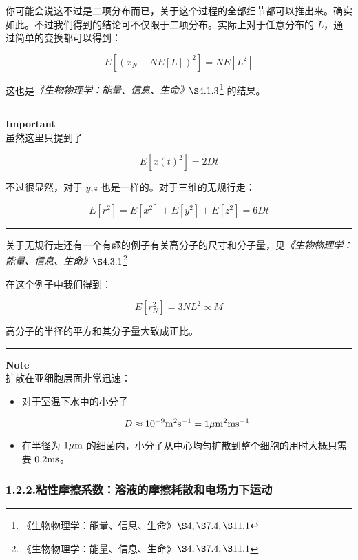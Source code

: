 \documentclass[
]{article}
\begin{document}
你可能会说这不过是二项分布而已，关于这个过程的全部细节都可以推出来。确实如此。不过我们得到的结论可不仅限于二项分布。实际上对于任意分布的
\(L\)，通过简单的变换都可以得到：

\[E[(x_N-NE[L])^2]=NE[L^2]\]

这也是\emph{《生物物理学：能量、信息、生命》\(\S4.1.3\)}\footnote{《生物物理学：能量、信息、生命》\(\S4,\S7.4,\S11.1\)}
的结果。

\begin{center}\rule{0.5\linewidth}{0.5pt}\end{center}

\textbf{Important}\\

虽然这里只提到了

\[E[x(t)^2]=2Dt\]

不过很显然，对于 \(y\),\(z\) 也是一样的。对于三维的无规行走：

\[E[r^2]=E[x^2]+E[y^2]+E[z^2]=6Dt\]

\begin{center}\rule{0.5\linewidth}{0.5pt}\end{center}

关于无规行走还有一个有趣的例子有关高分子的尺寸和分子量，见\emph{《生物物理学：能量、信息、生命》\(\S4.3.1\)}\footnote{《生物物理学：能量、信息、生命》\(\S4,\S7.4,\S11.1\)}

在这个例子中我们得到：

\[E[r_N^2]=3NL^2\propto M\]

高分子的半径的平方和其分子量大致成正比。

\begin{center}\rule{0.5\linewidth}{0.5pt}\end{center}

\textbf{Note}\\

扩散在亚细胞层面非常迅速：

\begin{itemize}
\item
  对于室温下水中的小分子

  \[D\approx 10^{-9}{\rm m^2 s^{-1}}=1{\rm \mu m^2ms^{-1}}\]
\item
  在半径为 \(1{\rm \mu m}\)
  的细菌内，小分子从中心均匀扩散到整个细胞的用时大概只需要
  \(0.2 {\rm ms}\)。
\end{itemize}

\subsubsection{1.2.2.粘性摩擦系数：溶液的摩擦耗散和电场力下运动}\label{122ux7c98ux6027ux6469ux64e6ux7cfbux6570ux6eb6ux6db2ux7684ux6469ux64e6ux8017ux6563ux548cux7535ux573aux529bux4e0bux8fd0ux52a8}
\end{document}
